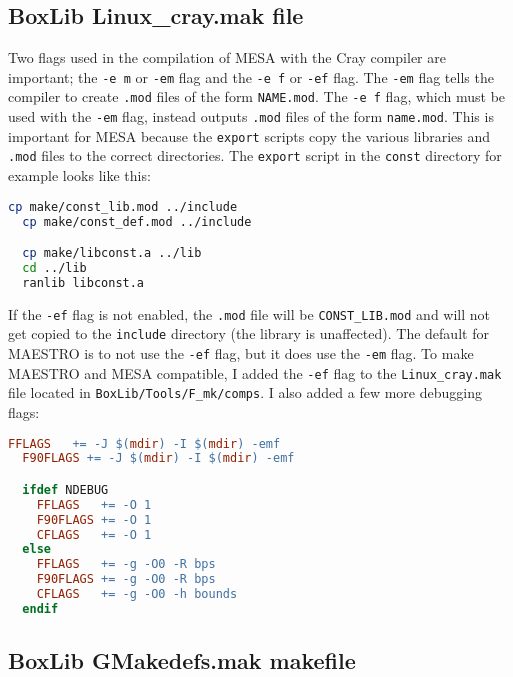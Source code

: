 \subsection{{\sf BoxLib Linux\_cray.mak} file}

Two flags used in the compilation of {\sf MESA} with the Cray compiler are 
important; the {\tt -e m} or {\tt -em} flag and the {\tt -e f} or {\tt -ef} 
flag. The {\tt -em} flag tells the compiler to create {\tt .mod} files of the 
form {\tt NAME.mod}. The {\tt -e f} flag, which must be used with the 
{\tt -em} flag, instead outputs {\tt .mod} files of the form {\tt name.mod}. 
This is important for {\sf MESA} because the {\tt export} scripts copy the 
various libraries and {\tt .mod} files to the correct directories. The 
{\tt export} script in the {\tt const} directory for example looks like this:
\begin{lstlisting}[language=bash,mathescape=false]
  cp make/const_lib.mod ../include
  cp make/const_def.mod ../include

  cp make/libconst.a ../lib
  cd ../lib
  ranlib libconst.a
\end{lstlisting}
If the {\tt -ef} flag is not enabled, the {\tt .mod} file will be 
{\tt CONST\_LIB.mod} and will not get copied to the {\tt include} directory 
(the library is unaffected). The default for {\sf MAESTRO} is to not use 
the {\tt -ef} flag, but it does use the {\tt -em} flag. To make {\sf MAESTRO} 
and {\sf MESA} compatible, I added the {\tt -ef} flag to the 
{\tt Linux\_cray.mak} file located in {\tt BoxLib/Tools/F\_mk/comps}. I also 
added a few more debugging flags:
\begin{lstlisting}[language=make,mathescape=false]
  FFLAGS   += -J $(mdir) -I $(mdir) -emf
  F90FLAGS += -J $(mdir) -I $(mdir) -emf

  ifdef NDEBUG
    FFLAGS   += -O 1
    F90FLAGS += -O 1
    CFLAGS   += -O 1
  else
    FFLAGS   += -g -O0 -R bps
    F90FLAGS += -g -O0 -R bps
    CFLAGS   += -g -O0 -h bounds
  endif 
\end{lstlisting}

\subsection{{\sf BoxLib GMakedefs.mak} makefile}

